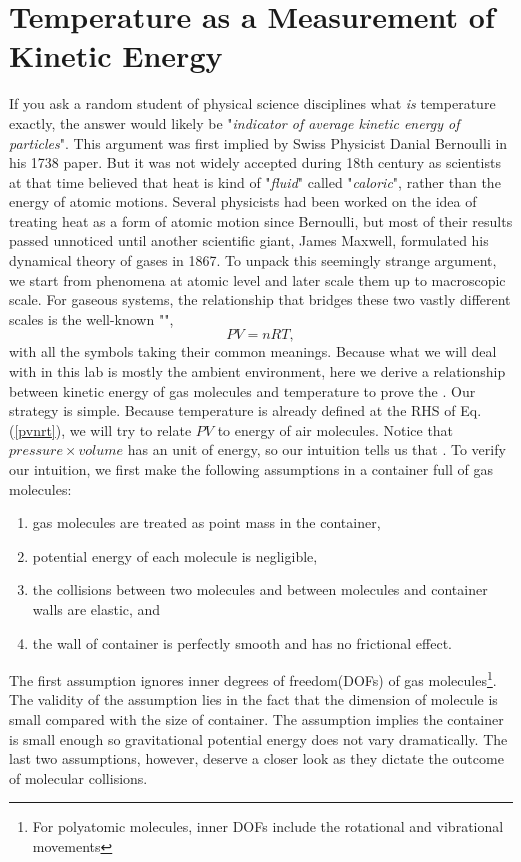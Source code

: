 \section{Temperature as a Measurement of Kinetic Energy}
If you ask a random student of physical science disciplines what \textit{is} temperature exactly, the answer would likely be "\textit{indicator of average kinetic energy of particles}". This argument was first implied by Swiss Physicist Danial Bernoulli in his 1738 paper\cite{bernoulli1738}. But it was not widely accepted during 18th century as scientists at that time believed that heat is kind of "\textit{fluid}" called "\textit{caloric}", rather than the energy of atomic motions\cite{brush2004history}. Several physicists had been worked on the idea of treating heat as a form of atomic motion since Bernoulli, but most of their results passed unnoticed until another scientific giant, James Maxwell, formulated his dynamical theory of gases in 1867\cite{maxwell1867illustrations}. To unpack this seemingly strange argument, we start from phenomena at atomic level and later scale them up to macroscopic scale. For gaseous systems, the relationship that bridges these two vastly different scales is the well-known "",
\begin{equation}
	PV=nRT\label{pvnrt},
\end{equation}
with all the symbols taking their common meanings. Because what we will  deal with in this lab is mostly the ambient environment, here we derive a relationship between kinetic energy of gas molecules and temperature to prove the . Our strategy is simple. Because temperature is already defined at the RHS of Eq.(\ref{pvnrt}), we will try to relate $ PV $ to energy of air molecules. Notice that $ pressure \times volume$ has an unit of energy, so our intuition tells us that . To verify our intuition, we first make the following assumptions in a container full of gas molecules:
\renewcommand{\labelenumi}{\Roman{enumi}.}
\begin{enumerate}
	\item gas molecules are treated as point mass in the container,
	\item potential energy of each molecule is negligible,
	\item the collisions between two molecules and between molecules and container walls are elastic, and
	\item the wall of container is perfectly smooth and has no frictional effect.
\end{enumerate}
The first assumption ignores inner degrees of freedom(DOFs) of gas molecules\footnote{For polyatomic molecules, inner DOFs include the rotational and vibrational movements}. The validity of the assumption lies in the fact that the dimension of molecule is small compared with the size of container. The assumption  implies the container is small enough so gravitational potential energy does not vary dramatically. The last two assumptions, however, deserve a closer look as they dictate the outcome of molecular collisions.
